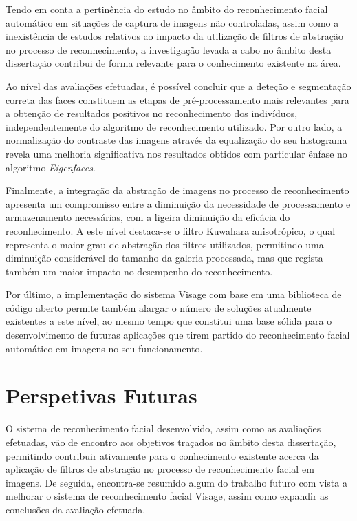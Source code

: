 Tendo em conta a pertinência do estudo no âmbito do reconhecimento facial automático em situações de captura de imagens não controladas, assim como a inexistência de estudos relativos ao impacto da utilização de filtros de abstração no processo de reconhecimento, a investigação levada a cabo no âmbito desta dissertação contribui de forma relevante para o conhecimento existente na área. 

Ao nível das avaliações efetuadas, é possível concluir que a deteção e segmentação correta das faces constituem as etapas de pré-processamento mais relevantes para a obtenção de resultados positivos no reconhecimento dos indivíduos, independentemente do algoritmo de reconhecimento utilizado. Por outro lado, a normalização do contraste das imagens através da equalização do seu histograma revela uma melhoria significativa nos resultados obtidos com particular ênfase no algoritmo \textit{Eigenfaces}. 

Finalmente, a integração da abstração de imagens no processo de reconhecimento apresenta um compromisso entre a diminuição da necessidade de processamento e armazenamento necessárias, com a ligeira diminuição da eficácia do reconhecimento. A este nível destaca-se o filtro Kuwahara anisotrópico, o qual representa o maior grau de abstração dos filtros utilizados, permitindo uma diminuição considerável do tamanho da galeria processada, mas que regista também um maior impacto no desempenho do reconhecimento.

Por último, a implementação do sistema Visage com base em uma biblioteca de código aberto permite também alargar o número de soluções atualmente existentes a este nível, ao mesmo tempo que constitui uma base sólida para o desenvolvimento de futuras aplicações que tirem partido do reconhecimento facial automático em imagens no seu funcionamento.

\section{Perspetivas Futuras}
O sistema de reconhecimento facial desenvolvido, assim como as avaliações efetuadas, vão de encontro aos objetivos traçados no âmbito desta dissertação, permitindo contribuir ativamente para o conhecimento existente acerca da aplicação de filtros de abstração no processo de reconhecimento facial em imagens. De seguida, encontra-se resumido algum do trabalho futuro com vista a melhorar o sistema de reconhecimento facial Visage, assim como expandir as conclusões da avaliação efetuada.

